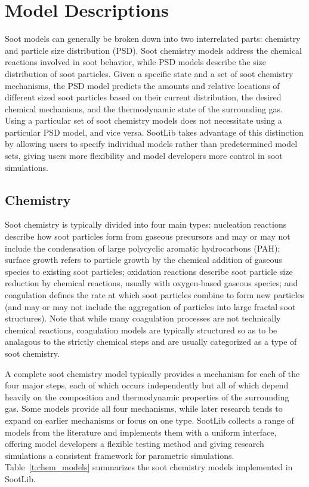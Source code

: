 \documentclass[preprint,12pt,letterpaper]{elsarticle}
\begin{document}

\section{Model Descriptions}
\label{s:models}

Soot models can generally be broken down into two interrelated parts: chemistry and particle size distribution (PSD). Soot chemistry models address the chemical reactions involved in soot behavior, while PSD models describe the size distribution of soot particles. Given a specific state and a set of soot chemistry mechanisms, the PSD model predicts the amounts and relative locations of different sized soot particles based on their current distribution, the desired chemical mechanisms, and the thermodynamic state of the surrounding gas. Using a particular set of soot chemistry models does not necessitate using a particular PSD model, and vice versa. SootLib takes advantage of this distinction by allowing users to specify individual models rather than predetermined model sets, giving users more flexibility and model developers more control in soot simulations.

\subsection{Chemistry}
\label{ss:chemistry}

Soot chemistry is typically divided into four main types: nucleation reactions describe how soot particles form from gaseous precursors and may or may not include the condensation of large polycyclic aromatic hydrocarbons (PAH); surface growth refers to particle growth by the chemical addition of gaseous species to existing soot particles; oxidation reactions describe soot particle size reduction by chemical reactions, usually with oxygen-based gaseous species; and coagulation defines the rate at which soot particles combine to form new particles (and may or may not include the aggregation of particles into large fractal soot structures). Note that while many coagulation processes are not technically chemical reactions, coagulation models are typically structured so as to be analagous to the strictly chemical steps and are usually categorized as a type of soot chemistry.

A complete soot chemistry model typically provides a mechanism for each of the four major steps, each of which occurs independently but all of which depend heavily on the composition and thermodynamic properties of the surrounding gas. Some models provide all four mechanisms, while later research tends to expand on earlier mechanisms or focus on one type. SootLib collects a range of models from the literature and implements them with a uniform interface, offering model developers a flexible testing method and giving research simulations a consistent framework for parametric simulations. Table~\ref{t:chem_models} summarizes the soot chemistry models implemented in SootLib.
\end{document}

